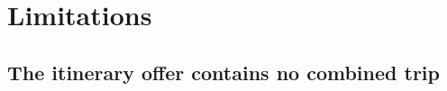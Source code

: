 

\section{Limitations}
\label{sec:limits}

\subsection{The itinerary offer contains no combined trip}
\label{sec:mixed}

